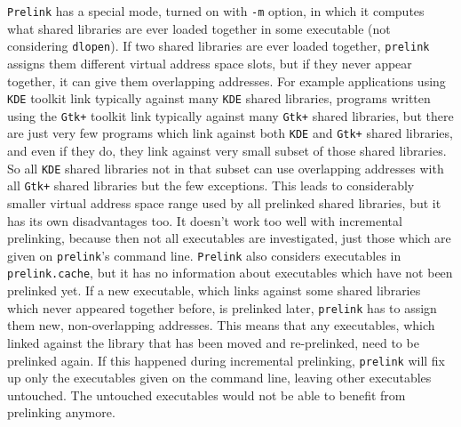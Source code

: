 \documentclass[twoside]{article}
\def\tts#1{\texttt{\small #1}}
\begin{document}
\tts{Prelink} has a special mode, turned on with \tts{-m} option, in which
it computes what shared libraries are ever loaded together in some executable
(not considering \tts{dlopen}).  If two shared libraries are ever loaded
together, \tts{prelink} assigns them different virtual address space slots,
but if they never appear together, it can give them overlapping addresses.
For example applications using \tts{KDE} toolkit link typically against many
\tts{KDE} shared libraries, programs written using the \tts{Gtk+} toolkit
link typically against many \tts{Gtk+} shared libraries, but there are just
very few programs which link against both \tts{KDE} and \tts{Gtk+} shared
libraries, and even if they do, they link against very small subset of those
shared libraries.  So all \tts{KDE} shared libraries not in that subset can
use overlapping addresses with all \tts{Gtk+} shared libraries but the
few exceptions.  This leads to considerably smaller virtual address space
range used by all prelinked shared libraries, but it has its own
disadvantages too.  It doesn't work too well with incremental prelinking,
because then not all executables are investigated, just those which are given
on \tts{prelink}'s command line.  \tts{Prelink} also considers executables
in \tts{prelink.cache}, but it has no information about executables which have
not been prelinked yet.  If a new executable, which links against some shared
libraries which never appeared together before, is prelinked later,
\tts{prelink} has to assign them new, non-overlapping addresses.
This means that any executables, which linked against the library
that has been moved and re-prelinked, need to be prelinked again.
If this happened during incremental prelinking, \tts{prelink} will
fix up only the executables given on the command line, leaving other
executables untouched.  The untouched executables would not be able to
benefit from prelinking anymore.
\end{document}
